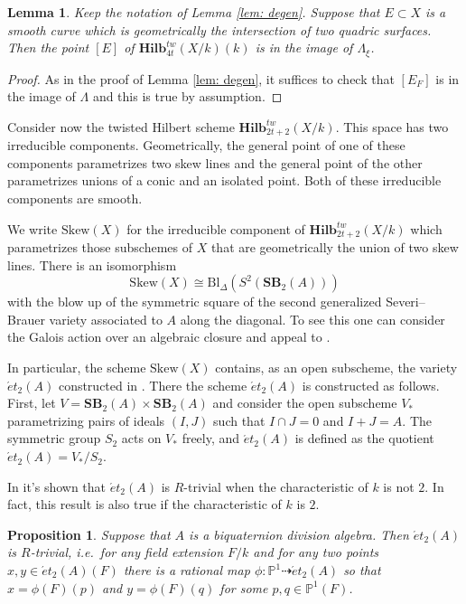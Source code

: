 \documentclass[12pt]{amsart}
\newtheorem{prop}[thm]{Proposition}
\newtheorem{lem}[thm]{Lemma}
\theoremstyle{definition}
\newcommand{\SB}{\mathbf{SB}}
\newcommand{\Hilb}{\mathbf{Hilb}}
\begin{document}
\begin{lem}\label{lem: ellh}
Keep the notation of Lemma \ref{lem: degen}. Suppose that $E\subset X$ is a smooth curve which is geometrically the intersection of two quadric surfaces. Then the point $[E]$ of $\Hilb_{4t}^{tw}(X/k)(k)$ is in the image of $\Lambda_\xi$.
\end{lem}

\begin{proof}
As in the proof of Lemma \ref{lem: degen}, it suffices to check that $[E_F]$ is in the image of $\Lambda$ and this is true by assumption.	
\end{proof}

Consider now the twisted Hilbert scheme $\Hilb_{2t+2}^{tw}(X/k)$. This space has two irreducible components. Geometrically, the general point of one of these components parametrizes two skew lines and the general point of the other parametrizes unions of a conic and an isolated point. Both of these irreducible components are smooth.

We write $\mathrm{Skew}(X)$ for the irreducible component of $\Hilb_{2t+2}^{tw}(X/k)$ which parametrizes those subschemes of $X$ that are geometrically the union of two skew lines. There is an isomorphism \[\mathrm{Skew}(X)\cong \mathrm{Bl}_{\Delta}(S^2(\SB_2(A)))\] with the blow up of the symmetric square of the second generalized Severi--Brauer variety associated to $A$ along the diagonal. To see this one can consider the Galois action over an algebraic closure and appeal to \cite[Theorem 1.1 (3)]{MR2834144}.

In particular, the scheme $\mathrm{Skew}(X)$ contains, as an open subscheme, the variety $\acute{e}t_2(A)$ constructed in \cite{MR2601007}. There the scheme $\acute{e}t_2(A)$ is constructed as follows. First, let $V=\SB_2(A)\times \SB_2(A)$ and consider the open subscheme $V_*$ parametrizing pairs of ideals $(I,J)$ such that $I\cap J=0$ and $I+J=A$. The symmetric group $S_2$ acts on $V_*$ freely, and $\acute{e}t_2(A)$ is defined as the quotient $\acute{e}t_2(A)=V_*/S_2$.

In \cite[Theorem 6.6]{MR2601007} it's shown that $\acute{e}t_2(A)$ is $R$-trivial when the characteristic of $k$ is not $2$. In fact, this result is also true if the characteristic of $k$ is $2$.

\begin{prop}\label{prop: rtriv}
Suppose that $A$ is a biquaternion division algebra. Then $\acute{e}t_2(A)$ is $R$-trivial, i.e.\ for any field extension $F/k$ and for any two points $x,y\in \acute{e}t_2(A)(F)$ there is a rational map $\phi:\mathbb{P}^1\dashrightarrow \acute{e}t_2(A)$ so that $x=\phi(F)(p)$ and $y=\phi(F)(q)$ for some $p,q\in \mathbb{P}^1(F)$.
\end{prop}
\end{document}
